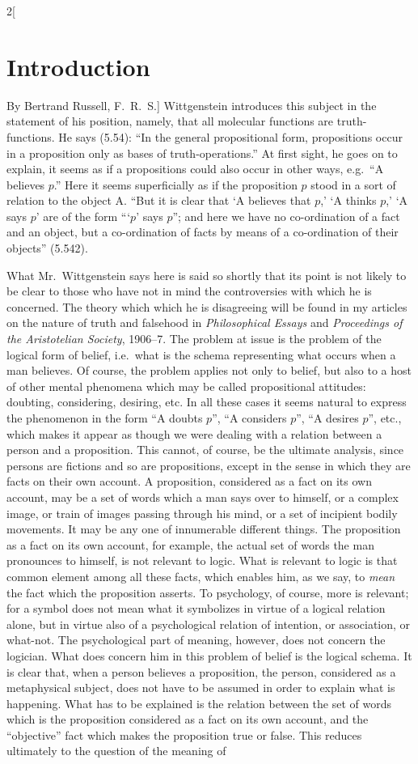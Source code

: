 \documentclass[oneside,openany,12pt]{book}
\begin{document}
\begin{multicols}{2}[\section*{Introduction}By Bertrand Russell, F.\ R.\ S.]
Wittgenstein introduces this subject in the statement of his position, namely, that all molecular functions are truth-functions. He says (5.54): ``In the general propositional form, propositions occur in a proposition only as bases of truth-operations.'' At first sight, he goes on to explain, it seems as if a propositions could also occur in other ways, e.g.\ ``A believes $p$.'' Here it seems superficially as if the proposition $p$ stood in a sort of relation to the object A. ``But it is clear that `A believes that $p$,' `A thinks $p$,' `A says $p$' are of the form ``{}`$p$' says $p$''; and here we have no co-ordination of a fact and an object, but a co-ordination of facts by means of a co-ordination of their objects'' (5.542).

What Mr.\ Wittgenstein says here is said so shortly that its point is not likely to be clear to those who have not in mind the controversies with which he is concerned. The theory which which he is disagreeing will be found in my articles on the nature of truth and falsehood in \emph{Philosophical Essays} and \emph{Proceedings of the Aristotelian Society}, 1906--7. The problem at issue is the problem of the logical form of belief, i.e.\ what is the schema representing what occurs when a man believes. Of course, the problem applies not only to belief, but also to a host of other mental phenomena which may be called propositional attitudes: doubting, considering, desiring, etc. In all these cases it seems natural to express the phenomenon in the form ``A doubts $p$'', ``A considers $p$'', ``A desires $p$'', etc., which makes it appear as though we were dealing with a relation between a person and a proposition. This cannot, of course, be the ultimate analysis, since persons are fictions and so are propositions, except in the sense in which they are facts on their own account. A proposition, considered as a fact on its own account, may be a set of words which a man says over to himself, or a complex image, or train of images passing through his mind, or a set of incipient bodily movements. It may be any one of innumerable different things. The proposition as a fact on its own account, for example, the actual set of words the man pronounces to himself, is not relevant to logic. What is relevant to logic is that common element among all these facts, which enables him, as we say, to \emph{mean} the fact which the proposition asserts. To psychology, of course, more is relevant; for a symbol does not mean what it symbolizes in virtue of a logical relation alone, but in virtue also of a psychological relation of intention, or association, or what-not. The psychological part of meaning, however, does not concern the logician. What does concern him in this problem of belief is the logical schema. It is clear that, when a person believes a proposition, the person, considered as a metaphysical subject, does not have to be assumed in order to explain what is happening. What has to be explained is the relation between the set of words which is the proposition considered as a fact on its own account, and the ``objective'' fact which makes the proposition true or false. This reduces ultimately to the question of the meaning of 
\end{multicols}
\end{document}
